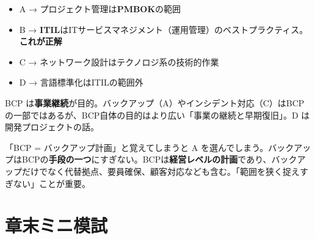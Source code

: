 \begin{goutoubun}
\begin{itemize}
  \item A → プロジェクト管理は\textbf{PMBOK}の範囲
  \item B → \textbf{ITIL}はITサービスマネジメント（運用管理）のベストプラクティス。\textbf{これが正解}
  \item C → ネットワーク設計はテクノロジ系の技術的作業
  \item D → 言語標準化はITILの範囲外
\end{itemize}
\end{goutoubun}


\begin{kaisetsu}
BCP は\textbf{事業継続}が目的。バックアップ（A）やインシデント対応（C）はBCPの一部ではあるが、BCP自体の目的はより広い「事業の継続と早期復旧」。D は開発プロジェクトの話。
\end{kaisetsu}

\begin{trickwarn}
「BCP = バックアップ計画」と覚えてしまうと A を選んでしまう。バックアップはBCPの\textbf{手段の一つ}にすぎない。BCPは\textbf{経営レベルの計画}であり、バックアップだけでなく代替拠点、要員確保、顧客対応なども含む。「範囲を狭く捉えすぎない」ことが重要。
\end{trickwarn}



\section*{章末ミニ模試}

